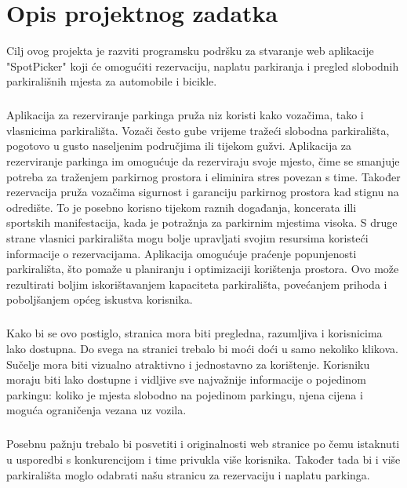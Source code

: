 \chapter{Opis projektnog zadatka}


{Cilj ovog projekta je razviti programsku podršku za stvaranje web aplikacije "SpotPicker" koji će omogućiti rezervaciju, naplatu parkiranja i pregled slobodnih parkirališnih mjesta za automobile i bicikle. }
\paragraph*{}{Aplikacija za rezerviranje parkinga pruža niz koristi kako vozačima, tako i vlasnicima parkirališta. Vozači često gube vrijeme tražeći slobodna parkirališta, pogotovo u gusto naseljenim područjima ili tijekom gužvi. Aplikacija za rezerviranje parkinga im omogućuje da rezerviraju svoje mjesto, čime se smanjuje potreba za traženjem parkirnog prostora i eliminira stres povezan s time. Također rezervacija pruža vozačima sigurnost i garanciju parkirnog prostora kad stignu na odredište. To je posebno korisno tijekom raznih događanja, koncerata illi sportskih manifestacija, kada je potražnja za parkirnim mjestima visoka. S druge strane vlasnici parkirališta mogu bolje upravljati svojim resursima koristeći informacije o rezervacijama. Aplikacija omogućuje praćenje popunjenosti parkirališta, što pomaže u planiranju i optimizaciji korištenja prostora. Ovo može rezultirati boljim iskorištavanjem kapaciteta parkirališta, povećanjem prihoda i poboljšanjem općeg iskustva korisnika.}
\paragraph*{}{Kako bi se ovo postiglo, stranica mora biti pregledna, razumljiva i korisnicima lako dostupna. Do svega na stranici trebalo bi moći doći u samo nekoliko klikova. Sučelje mora biti vizualno atraktivno i jednostavno za korištenje. Korisniku moraju biti lako dostupne i vidljive sve najvažnije informacije o pojedinom parkingu: koliko je mjesta slobodno na pojedinom parkingu, njena cijena i moguća ograničenja vezana uz vozila.}
\paragraph*{}{Posebnu pažnju trebalo bi posvetiti i originalnosti web stranice po čemu istaknuti u usporedbi s konkurencijom i time privukla više korisnika. Također tada bi i više parkirališta moglo odabrati našu stranicu za rezervaciju i naplatu parkinga.}
